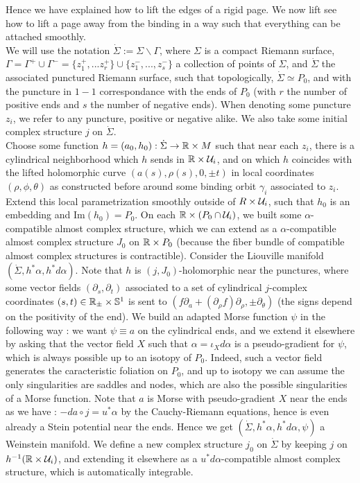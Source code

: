\documentclass[../main.tex]{subfiles}
\begin{document}
Hence we have explained how to lift the edges of a rigid page. We now lift see how to lift a page away from the binding in a way such that everything can be attached smoothly.\\

We will use the notation $\dot{\Sigma} := \Sigma\backslash\Gamma$, where $\Sigma$ is a compact Riemann surface, $\Gamma = \Gamma^+ \cup \Gamma^- = \{z_1^+,... z_r^+\}\cup\{z_1^-,...,z_s^-\}$ a collection of points of $\Sigma$, and $\dot{\Sigma}$ the associated punctured Riemann surface, such that topologically, $\dot\Sigma \simeq P_0$, and with the puncture in $1-1$ correspondance with the ends of $P_0$ (with $r$ the number of positive ends and $s$ the number of negative ends). When denoting some puncture $z_i$, we refer to any puncture, positive or negative alike. We also take some initial complex structure $j$ on $\dot \Sigma$.\\

Choose some function $h = (a_0,h_0) : \dot{\Sigma}\rightarrow \mathbb{R}\times M$ such that near each $z_i$, there is a cylindrical neighborhood which $h$ sends in $\mathbb{R}\times \mathcal{U}_i$, and on which $h$ coincides with the lifted holomorphic curve $(a(s),\rho(s),0,\pm t)$ in local coordinates $(\rho,\phi,\theta)$ as constructed before around some binding orbit $\gamma_i$ associated to $z_i$. Extend this local parametrization smoothly outside of $R\times \mathcal{U}_i$, such that $h_0$ is an embedding and $\text{Im}(h_0) = P_0$. On each $\mathbb{R}\times (P_0\cap\mathcal{U}_i)$, we built some $\alpha$-compatible almost complex structure, which we can extend as a $\alpha$-compatible almost complex structure $J_0$ on $\mathbb{R}\times P_0$ (because the fiber bundle of compatible almost complex structures is contractible). Consider the Liouville manifold $(\dot\Sigma,h^*\alpha,h^*d\alpha)$. Note that $h$ is $(j,J_0)$-holomorphic near the punctures, where some vector fields $(\partial_s,\partial_t)$ associated to a set of cylindrical $j$-complex coordinates $(s,t)\in\mathbb{R}_\pm \times \mathbb{S}^1$ is sent to $(f\partial_a + (\partial_\rho f)\partial_\rho,\pm\partial_\theta)$ (the signs depend on the positivity of the end). We build an adapted Morse function $\psi$ in the following way : we want $\psi\equiv a$ on the cylindrical ends, and we extend it elsewhere by asking that the vector field $X$ such that $\alpha = \iota_Xd\alpha$ is a pseudo-gradient for $\psi$, which is always possible up to an isotopy of $P_0$. Indeed, such a vector field generates the caracteristic foliation on $P_0$, and up to isotopy we can assume the only singularities are saddles and nodes, which are also the possible singularities of a Morse function. Note that $a$ is Morse with pseudo-gradient $X$ near the ends as we have : $-da\circ j = u^*\alpha$ by the Cauchy-Riemann equations, hence is even already a Stein potential near the ends. Hence we get $(\dot\Sigma,h^*\alpha,h^*d\alpha,\psi)$ a Weinstein manifold. We define a new complex structure $j_0$ on $\dot \Sigma$ by keeping $j$ on $h^{-1}(\mathbb{R}\times \mathcal{U}_i)$, and extending it elsewhere as a $u^*d\alpha$-compatible almost complex structure, which is automatically integrable.\\
\end{document}
